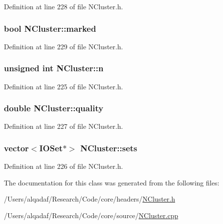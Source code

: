 Definition at line 228 of file NCluster.h.

\hypertarget{class_n_cluster_a89a39f622490f47ed6283b17fe1d0f44}{
\subsubsection[{marked}]{\setlength{\rightskip}{0pt plus 5cm}bool {\bf NCluster::marked}}}
\label{class_n_cluster_a89a39f622490f47ed6283b17fe1d0f44}


Definition at line 229 of file NCluster.h.

\hypertarget{class_n_cluster_a926e474ba279516160b52ab36d208a69}{
\subsubsection[{n}]{\setlength{\rightskip}{0pt plus 5cm}unsigned int {\bf NCluster::n}}}
\label{class_n_cluster_a926e474ba279516160b52ab36d208a69}


Definition at line 225 of file NCluster.h.

\hypertarget{class_n_cluster_a9e0aa868b02c27e6c282f9633a135aa9}{
\subsubsection[{quality}]{\setlength{\rightskip}{0pt plus 5cm}double {\bf NCluster::quality}}}
\label{class_n_cluster_a9e0aa868b02c27e6c282f9633a135aa9}


Definition at line 227 of file NCluster.h.

\hypertarget{class_n_cluster_a2333af10251a6a884395aab57b9fa400}{
\subsubsection[{sets}]{\setlength{\rightskip}{0pt plus 5cm}vector$<${\bf IOSet}$\ast$$>$ {\bf NCluster::sets}}}
\label{class_n_cluster_a2333af10251a6a884395aab57b9fa400}


Definition at line 226 of file NCluster.h.



The documentation for this class was generated from the following files:\begin{DoxyCompactItemize}
\item 
/Users/alqadaf/Research/Code/core/headers/\hyperlink{_n_cluster_8h}{NCluster.h}\item 
/Users/alqadaf/Research/Code/core/source/\hyperlink{_n_cluster_8cpp}{NCluster.cpp}\end{DoxyCompactItemize}
